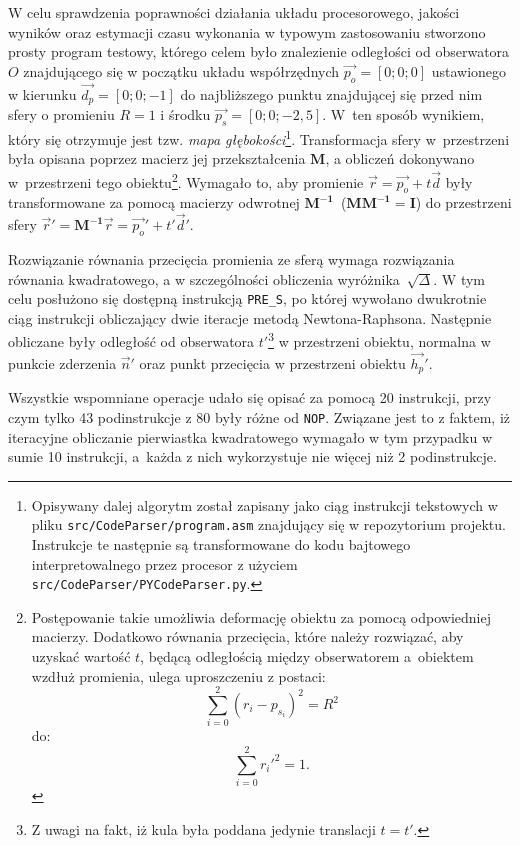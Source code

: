 \begin{enumerate}
\end{enumerate}

W celu sprawdzenia poprawności działania układu procesorowego, jakości wyników oraz estymacji czasu wykonania w typowym zastosowaniu stworzono prosty program testowy, którego celem było znalezienie odległości od obserwatora $O$ znajdującego się w początku układu współrzędnych $\vec{p_o} = [0; 0; 0]$ ustawionego w kierunku $\vec{d_p} = [0; 0; -1]$ do najbliższego punktu znajdującej się przed nim sfery o promieniu $R = 1$ i środku $\vec{p_s} = [0; 0; -2,5]$. W~ten sposób wynikiem, który się otrzymuje jest tzw. \textit{mapa głębokości}\footnote{Opisywany dalej algorytm został zapisany jako ciąg instrukcji tekstowych w pliku \texttt{src/CodeParser/program.asm} znajdujący się w repozytorium projektu. Instrukcje te następnie są transformowane do kodu bajtowego interpretowalnego przez procesor z użyciem \texttt{src/CodeParser/PYCodeParser.py}.}. Transformacja sfery w~przestrzeni była opisana poprzez macierz jej przekształcenia $\mathbf{M}$, a obliczeń dokonywano w~przestrzeni tego obiektu\footnote{Postępowanie takie umożliwia deformację obiektu za pomocą odpowiedniej macierzy. Dodatkowo równania przecięcia, które należy rozwiązać, aby uzyskać wartość $t$, będącą odległością między obserwatorem a~obiektem wzdłuż promienia, ulega uproszczeniu z postaci:
\begin{equation*}
\sum_{i=0}^2\left(r_i - p_{s_i} \right)^2 = R^2
\end{equation*}
do:
\begin{equation*}
\sum_{i=0}^2 r_i'^2 = 1.
\end{equation*}

}. Wymagało to, aby promienie $\vec{r} = \vec{p_o} + t\vec{d}$ były transformowane za pomocą macierzy odwrotnej $\mathbf{M^{-1}}$~($\mathbf{MM^{-1} = I}$) do przestrzeni sfery $\vec{r}' = \mathbf{M^{-1}}\vec{r} = \vec{p_o}' + t'\vec{d}'$. 

Rozwiązanie równania przecięcia promienia ze sferą wymaga rozwiązania równania kwadratowego, a w szczególności obliczenia wyróżnika~$\sqrt{\Delta}$. W tym celu posłużono się  dostępną instrukcją \texttt{PRE\_S}, po której wywołano dwukrotnie ciąg instrukcji obliczający dwie iteracje metodą Newtona-Raphsona. Następnie obliczane były odległość od obserwatora $t'$\footnote{Z uwagi na fakt, iż kula była poddana jedynie translacji $t = t'$.} w przestrzeni obiektu, normalna w punkcie zderzenia $\vec{n}'$ oraz punkt przecięcia w przestrzeni obiektu $\vec{h_p}'$.

Wszystkie wspomniane operacje udało się opisać za pomocą 20 instrukcji, przy czym tylko 43 podinstrukcje z 80 były różne od \texttt{NOP}. Związane jest to z faktem, iż iteracyjne obliczanie pierwiastka kwadratowego wymagało w tym przypadku w sumie 10 instrukcji, a~każda z nich wykorzystuje nie więcej niż 2 podinstrukcje. 

